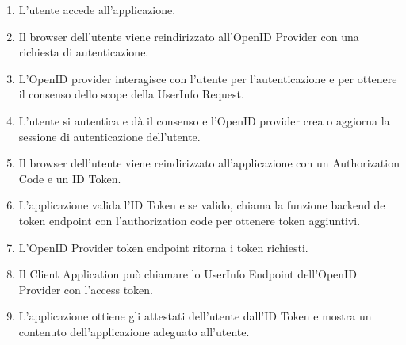 \begin{enumerate}
    \item L'utente accede all'applicazione.
    \item Il browser dell'utente viene reindirizzato all'OpenID Provider con una
          richiesta di autenticazione.
    \item L'OpenID provider interagisce con l'utente per l'autenticazione e per
          ottenere il consenso dello scope della UserInfo Request.
    \item L'utente si autentica e dà il consenso e l'OpenID provider crea o aggiorna
          la sessione di autenticazione dell'utente.
    \item Il browser dell'utente viene reindirizzato all'applicazione con un
          Authorization Code e un ID Token.
    \item L'applicazione valida l'ID Token e se valido, chiama la funzione backend
          de token endpoint con l'authorization code per ottenere token aggiuntivi.
    \item L'OpenID Provider token endpoint ritorna i token richiesti.
    \item Il Client Application può chiamare lo UserInfo Endpoint dell'OpenID
          Provider con l'access token.
    \item L'applicazione ottiene gli attestati dell'utente dall'ID Token e mostra un
          contenuto dell'applicazione adeguato all'utente.
\end{enumerate}
